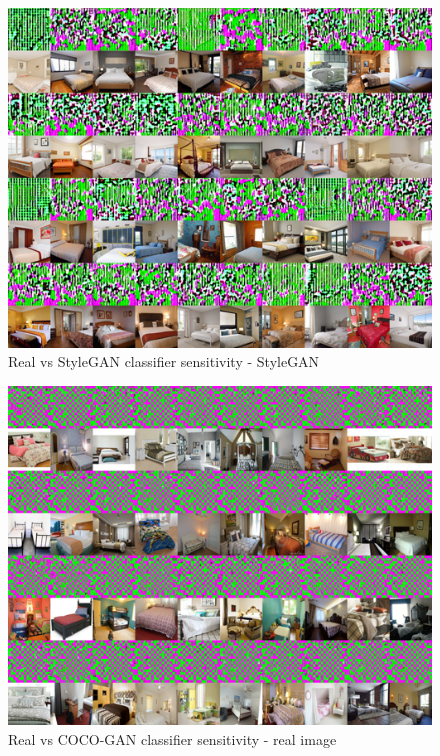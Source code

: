 \documentclass{article}
\begin{document}
    \begin{figure}[H]
      \centering
        \includegraphics[scale=.95]{smoothgrad-big/stylegan_model/testing-2-2-combined-dataset-stylegan-smoothgrad.png}
        \caption{Real vs StyleGAN classifier sensitivity - StyleGAN}
    \end{figure}
    
    \begin{figure}[H]
      \centering
        \includegraphics[scale=.95]{smoothgrad-big/cocogan_model/testing-2-2-combined-dataset-raw-smoothgrad.png}
    \caption{Real vs COCO-GAN classifier sensitivity - real image}
    \end{figure}
    
\end{document}
